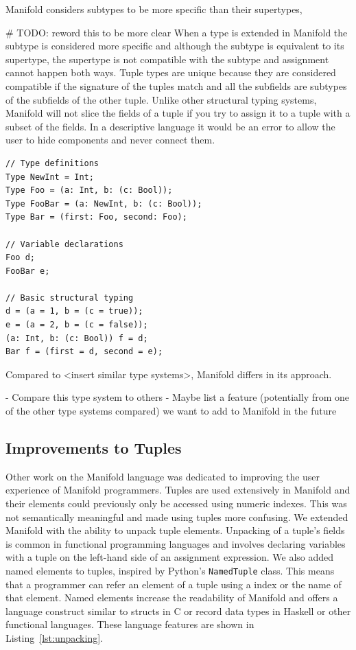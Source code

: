 Manifold considers subtypes to be more specific than their supertypes,

# TODO: reword this to be more clear
When a type is extended in Manifold the subtype is considered more specific and
although the subtype is equivalent to its supertype, the supertype is not
compatible with the subtype and assignment cannot happen both ways. Tuple types
are unique because they are considered compatible if the signature of the tuples
match and all the subfields are subtypes of the subfields of the other tuple.
Unlike other structural typing systems, Manifold will not slice the fields of a
tuple if you try to assign it to a tuple with a subset of the fields. In a
descriptive language it would be an error to allow the user to hide components
and never connect them.

\begin{lstlisting}[label=lst:types,caption=Example of types in a Manifold file]
// Type definitions
Type NewInt = Int;
Type Foo = (a: Int, b: (c: Bool));
Type FooBar = (a: NewInt, b: (c: Bool));
Type Bar = (first: Foo, second: Foo);

// Variable declarations
Foo d;
FooBar e;

// Basic structural typing
d = (a = 1, b = (c = true));
e = (a = 2, b = (c = false));
(a: Int, b: (c: Bool)) f = d;
Bar f = (first = d, second = e);
\end{lstlisting}

Compared to <insert similar type systems>, Manifold differs in its approach.

- Compare this type system to others
- Maybe list a feature (potentially from one of the other type systems compared) we want to add to Manifold in the future

\subsection{Improvements to Tuples}

Other work on the Manifold language was dedicated to improving the user experience
of Manifold programmers. Tuples are used extensively in Manifold and their
elements could previously only be accessed using numeric indexes. This was not
semantically meaningful and made using tuples more confusing. We extended
Manifold with the ability to unpack tuple elements. Unpacking of a tuple's
fields is common in functional programming languages and involves declaring
variables with a tuple on the left-hand side of an assignment expression. We
also added named elements to tuples, inspired by Python's \texttt{NamedTuple}
class. This means that a programmer can refer an element of a tuple using a
index or the name of that element. Named elements increase the readability of
Manifold and offers a language construct similar to structs in C or record
data types in Haskell or other functional languages. These language features
are shown in Listing~\ref{lst:unpacking}.

